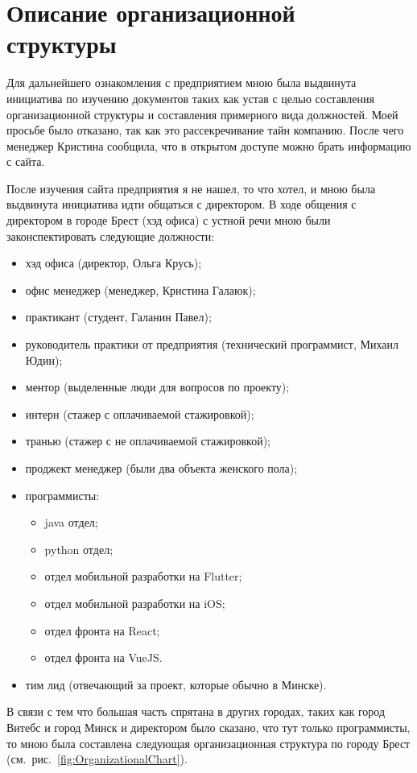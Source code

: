 \newpage
\section{Описание организационной структуры}

Для дальнейшего ознакомления с предприятием мною была выдвинута инициатива по изучению документов таких как устав
с целью составления организационной структуры и составления примерного вида должностей.
Моей просьбе было отказано, так как это рассекречивание тайн компанию.
После чего менеджер Кристина сообщила, что в открытом доступе можно брать информацию с сайта.

После изучения сайта предприятия я не нашел, то что хотел, и мною была выдвинута инициатива идти общаться с директором.
В ходе общения с директором в городе Брест (хэд офиса) с устной речи мною были законспектировать следующие должности:

\begin{itemize}
  \item хэд офиса (директор, Ольга Крусь);
  \item офис менеджер (менеджер, Кристина Галаюк);
  \item практикант (студент, Галанин Павел);
  \item руководитель практики от предприятия (технический программист, Михаил Юдин);
  \item ментор (выделенные люди для вопросов по проекту);
  \item интерн (стажер с оплачиваемой стажировкой);
  \item транью (стажер с не оплачиваемой стажировкой);
  \item проджект менеджер (были два объекта женского пола);
  \item программисты:
  \begin{itemize}
    \item java отдел;
    \item python отдел;
    \item отдел мобильной разработки на Flutter;
    \item отдел мобильной разработки на iOS;
    \item отдел фронта на React;
    \item отдел фронта на VueJS.
  \end{itemize}
  \item тим лид (отвечающий за проект, которые обычно в Минске).
\end{itemize}

В связи с тем что большая часть спрятана в других городах, таких как город Витебс и город Минск и директором было сказано,
что тут только программисты, то мною была составлена следующая организационная структура
по городу Брест (см.~рис.~\ref{fig:OrganizationalChart}).

